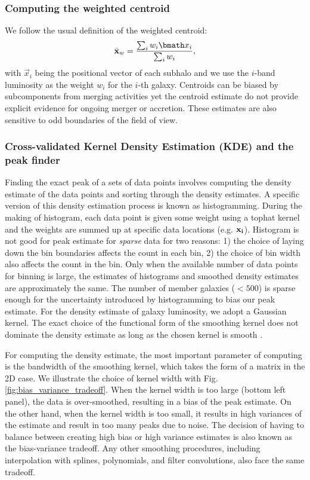 \subsubsection{Computing the weighted centroid}
\label{subsubsec:weighted_centroid}
We follow the usual definition of the weighted centroid: 
\begin{equation}
	\bar{\bf x}_w = \frac{\sum_i w_i \vec{x}_i}{\sum_i w_i},
\end{equation}
with $\vec{x}_i$ being the positional vector of each subhalo 
and we use the $i$-band luminosity 
as the weight $w_i$ for the $i$-th galaxy.
Centroids can be biased by subcomponents from merging activities yet the
centroid estimate do not provide explicit evidence for ongoing merger or 
accretion. These estimates are also sensitive to odd boundaries 
of the field of view.

\subsubsection{Cross-validated Kernel Density Estimation (KDE) and the peak finder} 
\label{subsubsec:KDE}
Finding the exact peak of a sets of data points 
involves computing the density estimate of the data points and sorting through
the density estimates. A specific version of this density estimation process is
known as histogramming. During the making of histogram, each data point is
given some weight using a tophat kernel and the weights are summed up at
specific data locations (e.g. $\bf{x}_i$). 
Histogram is not good for peak estimate for {\it sparse} data for two reasons: 1) the
choice of laying down the bin boundaries affects the count in each bin, 2) the choice of
bin width also affects the count in the bin. Only when the available number of data points
for binning is large, the estimates of histograms and smoothed density
estimates are approximately the same. The number of member galaxies ($< 500$) 
is sparse enough for the uncertainty introduced by histogramming to bias our
peak estimate. For the density estimate of galaxy luminosity, 
we adopt a Gaussian kernel. 
The exact choice of the functional form of the smoothing kernel does
not dominate the density estimate as long as the chosen kernel is
smooth \citep{Feigelson2014}. 

For computing the density estimate, the most important parameter of computing 
is the bandwidth of the smoothing kernel, 
which takes the form of a matrix in the 2D case. 
 We illustrate the choice of kernel width with Fig.
\ref{fig:bias_variance_tradeoff}. When the kernel width is
too large (bottom left panel), the data is over-smoothed, 
resulting in a bias of the peak estimate. On the other hand, when the kernel
width is too small, it results in high variances of the estimate and result in
too many peaks due to noise. The decision of having to balance between creating high
bias or high variance estimates is also known as the bias-variance tradeoff. 
Any other smoothing procedures, including interpolation with splines,
polynomials, and filter convolutions, also face the same tradeoff. 

